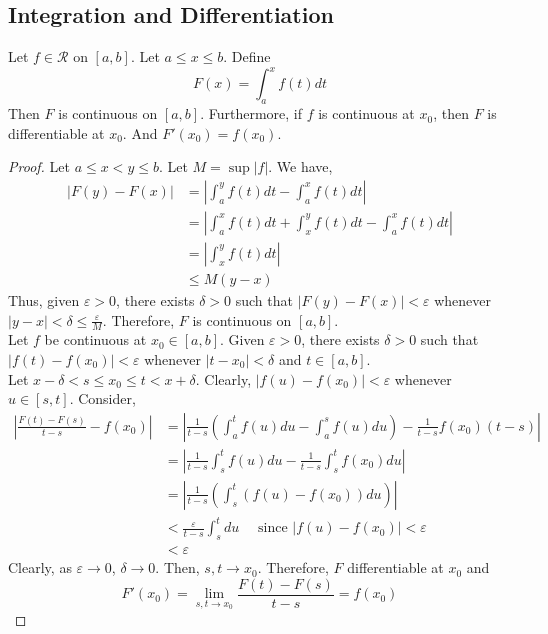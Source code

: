 \subsection{Integration and Differentiation}
\begin{theorem}
	Let $f \in \mathscr{R}$ on $[a,b]$.
	Let $a \le x \le b$.
	Define
	\[ F(x) = \int_a^x f(t)dt \]
	Then $F$ is continuous on $[a,b]$.
	Furthermore, if $f$ is continuous at $x_0$, then $F$ is differentiable at $x_0$.
	And $F'(x_0) = f(x_0)$.
\end{theorem}
\begin{proof}
	Let $a\le x < y \le b$.
	Let $M = \sup |f|$.
	We have,
	\begin{align*}
	|F(y)-F(x)| 
		& = \left| \int_a^y f(t) dt - \int_a^x f(t) dt \right| \\
		& = \left| \int_a^x f(t) dt + \int_x^y f(t) dt - \int_a^x f(t) dt \right| \\
		& = \left| \int_x^y f(t) dt \right| \\
		& \le M(y-x)
	\end{align*}
	Thus, given $\varepsilon > 0$, there exists $\delta > 0$ such that $|F(y)-F(x)| < \varepsilon$ whenever $|y-x| < \delta \le \frac{\varepsilon}{M}$.
	Therefore, $F$ is continuous on $[a,b]$.\\

	Let $f$ be continuous at $x_0 \in [a,b]$.
	Given $\varepsilon > 0$, there exists $\delta > 0$ such that $|f(t)-f(x_0)| < \varepsilon$ whenever $|t-x_0| < \delta$ and $t \in [a,b]$.\\

	Let $x-\delta < s \le x_0 \le t < x+\delta$.
	Clearly, $|f(u)-f(x_0)| < \varepsilon$ whenever $u \in [s,t]$.
	Consider,
	\begin{align*}
	\left| \frac{F(t) - F(s)}{t-s} - f(x_0) \right| 
		& = \left| \frac{1}{t-s} \left( \int_a^t f(u) du - \int_a^s f(u) du \right) - \frac{1}{t-s} f(x_0)(t-s) \right| \\
		& = \left| \frac{1}{t-s} \int_s^t f(u) du  - \frac{1}{t-s} \int_s^t f(x_0)du \right| \\
		& = \left| \frac{1}{t-s} \left( \int_s^t (f(u)-f(x_0)) du \right) \right| \\
		& < \frac{\varepsilon}{t-s} \int_s^t du \quad \text{ since } |f(u)-f(x_0)| < \varepsilon  \\
		& < \varepsilon
	\end{align*}
	Clearly, as $\varepsilon \to 0$, $\delta \to 0$.
	Then, $s,t \to x_0$.
	Therefore, $F$ differentiable at $x_0$ and
	\[ F'(x_0) = \lim_{s,t \to x_0} \frac{F(t)-F(s)}{t-s} =  f(x_0) \]
\end{proof}

